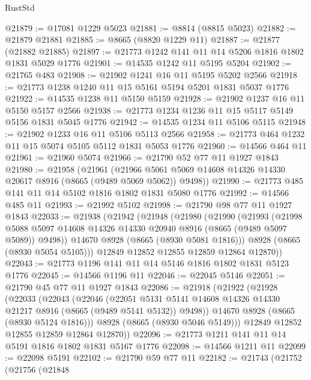 \begin{lexlean}{RustStd}
\begin{coremodule}
@21879 := @17081 @1229 @5023
@21881 := @8814 (@8815 @5023)
@21882 := @21879 @21881
@21885 := @8665 (@8820 @1229 @11)
@21887 := @21877 (@21882 @21885)
@21897 := @21773 @1242 @141 @11 @14 @5206 @1816 @1802 @1831 @5029 @1776
@21901 := @14535 @1242 @11 @5195 @5204
@21902 := @21765 @483
@21908 := @21902 @1241 @16 @11 @5195 @5202 @2566
@21918 := @21773 @1238 @1240 @11 @15 @5161 @5194 @5201 @1831 @5037 @1776
@21922 := @14535 @1238 @11 @5150 @5159
@21928 := @21902 @1237 @16 @11 @5150 @5157 @2566
@21938 := @21773 @1234 @1236 @11 @15 @5117 @5149 @5156 @1831 @5045 @1776
@21942 := @14535 @1234 @11 @5106 @5115
@21948 := @21902 @1233 @16 @11 @5106 @5113 @2566
@21958 := @21773 @464 @1232 @11 @15 @5074 @5105 @5112 @1831 @5053 @1776
@21960 := @14566 @464 @11
@21961 := @21960 @5074
@21966 := @21790 @52 @77 @11 @1927 @1843
@21980 := @21958
    (@21961
      (@21966 @5061 @5069 @14608 @14326 @14330 @20617 @8916 (@8665 (@9489 @5069 @5062)) @9498))
@21990 := @21773 @485 @141 @11 @14 @5102 @1816 @1802 @1831 @5080 @1776
@21992 := @14566 @485 @11
@21993 := @21992 @5102
@21998 := @21790 @98 @77 @11 @1927 @1843
@22033 := @21938
    (@21942
      (@21948
        (@21980
          (@21990
            (@21993
              (@21998
                @5088
                @5097
                @14608
                @14326
                @14330
                @20940
                @8916
                (@8665 (@9489 @5097 @5089))
                @9498))
            @14670
            @8928
            (@8665 (@8930 @5081 @1816)))
          @8928
          (@8665 (@8930 @5054 @5105)))
        @12849
        @12852
        @12855
        @12859
        @12864
        @12870))
@22043 := @21773 @1196 @141 @11 @14 @5146 @1816 @1802 @1831 @5123 @1776
@22045 := @14566 @1196 @11
@22046 := @22045 @5146
@22051 := @21790 @45 @77 @11 @1927 @1843
@22086 := @21918
    (@21922
      (@21928
        (@22033
          (@22043
            (@22046
              (@22051
                @5131
                @5141
                @14608
                @14326
                @14330
                @21217
                @8916
                (@8665 (@9489 @5141 @5132))
                @9498))
            @14670
            @8928
            (@8665 (@8930 @5124 @1816)))
          @8928
          (@8665 (@8930 @5046 @5149)))
        @12849
        @12852
        @12855
        @12859
        @12864
        @12870))
@22096 := @21773 @1211 @141 @11 @14 @5191 @1816 @1802 @1831 @5167 @1776
@22098 := @14566 @1211 @11
@22099 := @22098 @5191
@22102 := @21790 @59 @77 @11
@22182 := @21743
    (@21752
      (@21756
        (@21848

\end{coremodule}
\end{lexlean}
